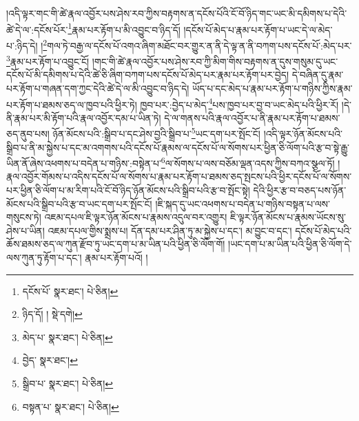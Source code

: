 །འདི་ལྟར་གང་གི་ཚེ་རྣལ་འབྱོར་པས་ཤེས་རབ་ཀྱིས་བརྟགས་ན་དངོས་པོའི་ངོ་བོ་ཉིད་གང་ཡང་མི་དམིགས་པ་དེའི་ཚེ་དེ་ལ་:དངོས་པོར་\footnote{དངོས་པོ་  སྣར་ཐང་།  པེ་ཅིན། }རྣམ་པར་རྟོག་པ་མི་འབྱུང་བ་ཉིད་དོ། །དངོས་པོ་མེད་པ་རྣམ་པར་རྟོག་པ་ཡང་དེ་ལ་མེད་པ་:ཉིད་དེ། །\footnote{ཉིད་དོ། །  སྡེ་དགེ། }གལ་ཏེ་བརྒྱ་ལ་དངོས་པོ་འགའ་ཞིག་མཐོང་བར་གྱུར་ན་ནི་དེ་ལྟ་ན་ནི་བཀག་པས་དངོས་པོ་:མེད་པར་\footnote{མེད་པ་  སྣར་ཐང་།  པེ་ཅིན། }རྣམ་པར་རྟོག་པ་འབྱུང་ངོ། །གང་གི་ཚེ་རྣལ་འབྱོར་པས་ཤེས་རབ་ཀྱི་མིག་གིས་བརྟགས་ན་དུས་གསུམ་དུ་ཡང་དངོས་པོ་མི་དམིགས་པ་དེའི་ཚེ་ཅི་ཞིག་བཀག་པས་དངོས་པོ་མེད་པར་རྣམ་པར་རྟོག་པར་བྱེད། དེ་བཞིན་དུ་རྣམ་པར་རྟོག་པ་གཞན་དག་ཀྱང་དེའི་ཚེ་དེ་ལ་མི་འབྱུང་བ་ཉིད་དེ། ཡོད་པ་དང་མེད་པ་རྣམ་པར་རྟོག་པ་གཉིས་ཀྱིས་རྣམ་པར་རྟོག་པ་ཐམས་ཅད་ལ་ཁྱབ་པའི་ཕྱིར་ཏེ། ཁྱབ་པར་:བྱེད་པ་མེད་\footnote{བྱེད་  སྣར་ཐང་། }པས་ཁྱབ་པར་བྱ་བ་ཡང་མེད་པའི་ཕྱིར་རོ། །དེ་ནི་རྣམ་པར་མི་རྟོག་པའི་རྣལ་འབྱོར་དམ་པ་ཡིན་ཏེ། དེ་ལ་གནས་པའི་རྣལ་འབྱོར་པ་ནི་རྣམ་པར་རྟོག་པ་ཐམས་ཅད་ནུབ་པས། ཉོན་མོངས་པའི་:སྒྲིབ་པ་དང་ཤེས་བྱའི་སྒྲིབ་པ་\footnote{སྒྲིབ་པ་  སྣར་ཐང་།  པེ་ཅིན། }ཡང་དག་པར་སྤོང་ངོ། །འདི་ལྟར་ཉོན་མོངས་པའི་སྒྲིབ་པ་ནི་མ་སྐྱེས་པ་དང་མ་འགགས་པའི་དངོས་པོ་རྣམས་ལ་དངོས་པོ་ལ་སོགས་པར་ཕྱིན་ཅི་ལོག་པའི་རྩ་བ་སྟེ་རྒྱུ་ཡིན་ནོ་ཞེས་འཕགས་པ་བདེན་པ་གཉིས་:བསྟེན་པ་\footnote{བསྟན་པ་  སྣར་ཐང་།  པེ་ཅིན། }ལ་སོགས་པ་ལས་བཅོམ་ལྡན་འདས་ཀྱིས་བཀའ་སྩལ་ཏོ། །རྣལ་འབྱོར་གོམས་པ་འདིས་དངོས་པོ་ལ་སོགས་པ་རྣམ་པར་རྟོག་པ་ཐམས་ཅད་སྤངས་པའི་ཕྱིར་དངོས་པོ་ལ་སོགས་པར་ཕྱིན་ཅི་ལོག་པ་མ་རིག་པའི་ངོ་བོ་ཉིད་ཉོན་མོངས་པའི་སྒྲིབ་པའི་རྩ་བ་སྤོང་སྟེ། དེའི་ཕྱིར་རྩ་བ་བཅད་པས་ཉོན་མོངས་པའི་སྒྲིབ་པའི་རྩ་བ་ཡང་དག་པར་སྤོང་ངོ། །ཇི་སྐད་དུ་ཡང་འཕགས་པ་བདེན་པ་གཉིས་བསྟན་པ་ལས་གསུངས་ཏེ། འཇམ་དཔལ་ཇི་ལྟར་ཉོན་མོངས་པ་རྣམས་འདུལ་བར་འགྱུར། ཇི་ལྟར་ཉོན་མོངས་པ་རྣམས་ཡོངས་སུ་ཤེས་པ་ཡིན། འཇམ་དཔལ་གྱིས་སྨྲས་པ། དོན་དམ་པར་ཤིན་ཏུ་མ་སྐྱེས་པ་དང་། མ་བྱུང་བ་དང་། དངོས་པོ་མེད་པའི་ཆོས་ཐམས་ཅད་ལ་ཀུན་རྫོབ་ཏུ་ཡང་དག་པ་མ་ཡིན་པའི་ཕྱིན་ཅི་ལོག་གོ། །ཡང་དག་པ་མ་ཡིན་པའི་ཕྱིན་ཅི་ལོག་དེ་ལས་ཀུན་ཏུ་རྟོག་པ་དང་། རྣམ་པར་རྟོག་པའོ། །
